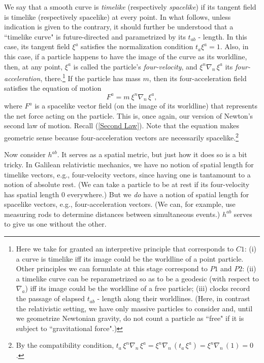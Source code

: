 \documentclass [12] {article}
\theoremstyle{plain}
\numberwithin{figure}{subsection}
\numberwithin{proposition}{subsection}
\begin{document}

We say that a smooth curve is  \emph{timelike} (respectively \emph{spacelike}) if  its tangent field is timelike (respectively spacelike) at every point.   In what follows, unless indication is  given to the contrary, it should further be understood that  a ``timelike curve" is future-directed and parametrized by its $t_{ab}$ - length.  In this case, its tangent field $\xi^a$ satisfies the normalization condition $t_a \xi^a = 1$. Also, in this case,  if a particle happens to have the image of the curve as its worldline,  then, at any point, $\xi^a$ is called the particle's \emph{four-velocity}, and $\xi^n \nabla_n \, \xi^a$ its \emph{four-acceleration}, there.\footnote{Here we take for granted an interpretive principle that corresponds to $C1$:  (i) a curve is timelike iff its image could be the worldline of a point particle. Other principles we can formulate at this stage correspond to $P1$ and $P2$:  (ii) a timelike curve can be reparametrized so as to be a geodesic (with respect to $\nabla_a $) iff its image could be the worldline of a free particle;  (iii) clocks record the passage of elapsed $t_{ab}$ - length along their worldlines.  (Here, in contrast the relativistic setting, we have only massive particles to consider and, until we geometrize Newtonian gravity, do not count a particle as ``free" if it is subject to ``gravitational force".)} If the particle has mass $m$,  then its  four-acceleration field satisfies the equation of motion
\begin{equation} \label{Newt second law again}
F^a = m \ \xi^n \nabla_n \, \xi^a, 
\end{equation}
where $F^a$ is a spacelike vector field (on the image of its worldline) that represents the net force acting on the particle. This is, once again, our version of Newton's second law of motion. Recall  (\ref{Second Law}).  Note that the equation makes geometric sense because four-acceleration vectors are necessarily spacelike.\footnote{By the compatibility condition,     $t_a \, \xi^n \nabla_n \, \xi^a =  \xi^n \nabla_n \, (t_a \,\xi^a) = \xi^n \nabla_n \, (1) = 0$.}

Now consider $h^{ab}$. It serves as a spatial metric, but just how it does so is a bit tricky.  In Galilean relativistic mechanics,  we have no notion of spatial length for timelike vectors, e.g., four-velocity vectors,  since having one is tantamount to a notion of absolute rest.  (We can take a particle to be at rest if its four-velocity has spatial length $0$ everywhere.) But we \emph{do} have a notion of spatial length for spacelike vectors, e.g., four-acceleration vectors.  (We can, for example, use measuring rods to determine distances between simultaneous events.) $h^{ab}$ serves to give us one without the other.
\end{document}
